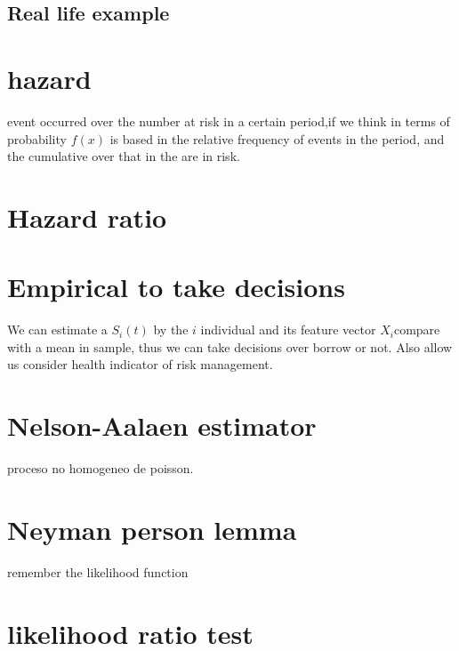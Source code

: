 \documentclass[10pt,a4paper]{article}
\begin{document}
\subsection{Real life example}









\section{hazard}
event occurred over the number at risk in a certain period,if we think in terms of probability $f(x)$ is based in the relative frequency of events in the period, and the cumulative over that in the are in risk. 

\section{Hazard ratio}




\section{Empirical to take decisions}
We can estimate a $S_{i}(t)$ by the $i$  individual and  its feature vector $X_{i}$compare with a mean in sample, thus we can take decisions over borrow or not. Also allow us consider health indicator of risk management.






\section{Nelson-Aalaen estimator}
proceso no homogeneo de poisson.








\section{Neyman person lemma}

remember the likelihood function





\section{likelihood ratio test}
\end{document}
